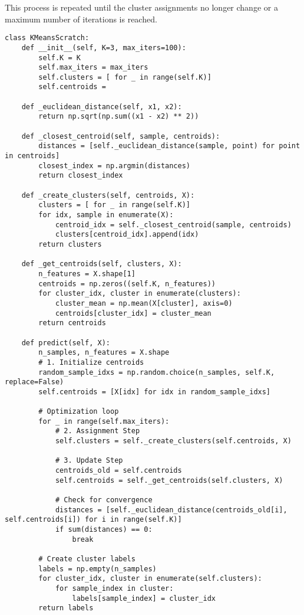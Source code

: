 \documentclass[11pt,a4paper]{article}
\begin{document}
This process is repeated until the cluster assignments no longer change or a maximum number of iterations is reached.

\begin{lstlisting}
class KMeansScratch:
    def __init__(self, K=3, max_iters=100):
        self.K = K
        self.max_iters = max_iters
        self.clusters = [ for _ in range(self.K)]
        self.centroids =

    def _euclidean_distance(self, x1, x2):
        return np.sqrt(np.sum((x1 - x2) ** 2))

    def _closest_centroid(self, sample, centroids):
        distances = [self._euclidean_distance(sample, point) for point in centroids]
        closest_index = np.argmin(distances)
        return closest_index

    def _create_clusters(self, centroids, X):
        clusters = [ for _ in range(self.K)]
        for idx, sample in enumerate(X):
            centroid_idx = self._closest_centroid(sample, centroids)
            clusters[centroid_idx].append(idx)
        return clusters

    def _get_centroids(self, clusters, X):
        n_features = X.shape[1]
        centroids = np.zeros((self.K, n_features))
        for cluster_idx, cluster in enumerate(clusters):
            cluster_mean = np.mean(X[cluster], axis=0)
            centroids[cluster_idx] = cluster_mean
        return centroids

    def predict(self, X):
        n_samples, n_features = X.shape
        # 1. Initialize centroids
        random_sample_idxs = np.random.choice(n_samples, self.K, replace=False)
        self.centroids = [X[idx] for idx in random_sample_idxs]

        # Optimization loop
        for _ in range(self.max_iters):
            # 2. Assignment Step
            self.clusters = self._create_clusters(self.centroids, X)
            
            # 3. Update Step
            centroids_old = self.centroids
            self.centroids = self._get_centroids(self.clusters, X)
            
            # Check for convergence
            distances = [self._euclidean_distance(centroids_old[i], self.centroids[i]) for i in range(self.K)]
            if sum(distances) == 0:
                break
        
        # Create cluster labels
        labels = np.empty(n_samples)
        for cluster_idx, cluster in enumerate(self.clusters):
            for sample_index in cluster:
                labels[sample_index] = cluster_idx
        return labels
\end{lstlisting}
\end{document}
